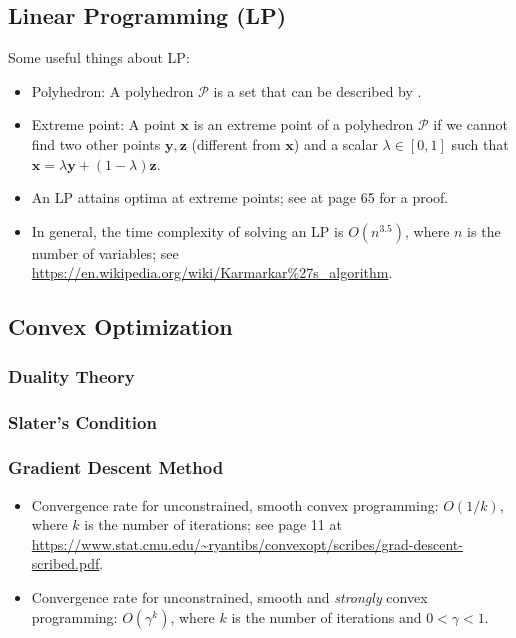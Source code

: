 

\subsection{Linear Programming (LP)}
    Some useful things about LP:
    \begin{itemize}
        \item Polyhedron: A polyhedron $\mathcal{P}$ is a set that can be described by .
        \item Extreme point: A point $\bm{x}$ is an extreme point of a polyhedron $\mathcal{P}$ if we cannot find two other points $\bm{y}, \bm{z}$ (different from $\bm{x}$) and a scalar $\lambda \in [0, 1]$ such that $\bm{x} = \lambda \bm{y} + (1-\lambda) \bm{z}$.
        \item An LP attains optima at extreme points; see \cite{bertsimas1997introduction} at page 65 for a proof.
        \item In general, the time complexity of solving an LP is $O(n^{3.5})$, where $n$ is the number of variables; see \url{https://en.wikipedia.org/wiki/Karmarkar%27s_algorithm}. 
    \end{itemize}
    
    
    
\subsection{Convex Optimization}
    \subsubsection{Duality Theory}
    
    \subsubsection{Slater's Condition}
    
    \subsubsection{Gradient Descent Method}
    \begin{itemize}
        \item Convergence rate for unconstrained, smooth convex programming: $O(1/k)$, where $k$ is the number of iterations; see page 11 at \url{https://www.stat.cmu.edu/~ryantibs/convexopt/scribes/grad-descent-scribed.pdf}.
        \item Convergence rate for unconstrained, smooth and \emph{strongly} convex programming: $O(\gamma^k)$, where $k$ is the number of iterations and $0 < \gamma < 1$.
    \end{itemize}
    
